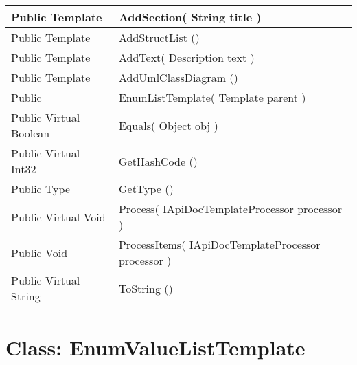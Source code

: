 \documentclass[11pt, oneside, a4paper]{book}
\begin{document}
\begin{center}
\begin{tabular}{| p{3cm} | p{12cm} | }
\hline
 Public  Template &  AddSection(\hypertarget{SoftwareEngineeringTools.{}Documentation.{}EnumListTemplate.{}AddSection\_String}{} String  title  )\\
\hline
 Public  Template &  AddStructList ()\hypertarget{SoftwareEngineeringTools.{}Documentation.{}EnumListTemplate.{}AddStructList}{}\\
\hline
 Public  Template &  AddText(\hypertarget{SoftwareEngineeringTools.{}Documentation.{}EnumListTemplate.{}AddText\_Description}{} Description  text  )\\
\hline
 Public  Template &  AddUmlClassDiagram ()\hypertarget{SoftwareEngineeringTools.{}Documentation.{}EnumListTemplate.{}AddUmlClassDiagram}{}\\
\hline
 Public  &  EnumListTemplate(\hypertarget{SoftwareEngineeringTools.{}Documentation.{}EnumListTemplate.{}EnumListTemplate\_Template}{} Template  parent  )\\
\hline
 Public  Virtual  Boolean &  Equals(\hypertarget{SoftwareEngineeringTools.{}Documentation.{}EnumListTemplate.{}Equals\_Object}{} Object  obj  )\\
\hline
 Public  Virtual  Int32 &  GetHashCode ()\hypertarget{SoftwareEngineeringTools.{}Documentation.{}EnumListTemplate.{}GetHashCode}{}\\
\hline
 Public  Type &  GetType ()\hypertarget{SoftwareEngineeringTools.{}Documentation.{}EnumListTemplate.{}GetType}{}\\
\hline
 Public  Virtual  Void &  Process(\hypertarget{SoftwareEngineeringTools.{}Documentation.{}EnumListTemplate.{}Process\_IApiDocTemplateProcessor}{} IApiDocTemplateProcessor  processor  )\\
\hline
 Public  Void &  ProcessItems(\hypertarget{SoftwareEngineeringTools.{}Documentation.{}EnumListTemplate.{}ProcessItems\_IApiDocTemplateProcessor}{} IApiDocTemplateProcessor  processor  )\\
\hline
 Public  Virtual  String &  ToString ()\hypertarget{SoftwareEngineeringTools.{}Documentation.{}EnumListTemplate.{}ToString}{}\\
\hline
\end{tabular}
\end{center}
 


\hypertarget{SoftwareEngineeringTools.{}Documentation.{}EnumValueListTemplate}{}
\section{Class: EnumValueListTemplate}
\end{document}
